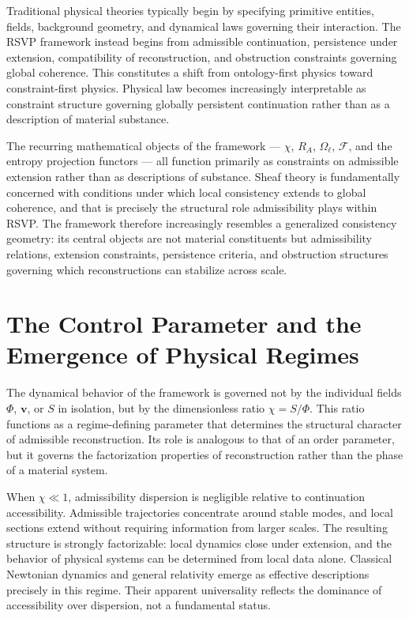 \documentclass[11pt, a4paper]{article}
\theoremstyle{plain}
\theoremstyle{definition}
\theoremstyle{remark}
\newcommand{\RA}{R_{\!A}}
\newcommand{\sheaf}{\mathcal{F}}
\begin{document}
Traditional physical theories typically begin by specifying primitive entities,
fields, background geometry, and dynamical laws governing their interaction. The RSVP
framework instead begins from admissible continuation, persistence under extension,
compatibility of reconstruction, and obstruction constraints governing global
coherence. This constitutes a shift from ontology-first physics toward
constraint-first physics. Physical law becomes increasingly interpretable as
constraint structure governing globally persistent continuation rather than as a
description of material substance.

The recurring mathematical objects of the framework --- $\chi$, $\RA$, $\Omega_\ell$,
$\sheaf$, and the entropy projection functors --- all function primarily as
constraints on admissible extension rather than as descriptions of substance. Sheaf
theory is fundamentally concerned with conditions under which local consistency
extends to global coherence, and that is precisely the structural role admissibility
plays within RSVP\@. The framework therefore increasingly resembles a generalized
consistency geometry: its central objects are not material constituents but
admissibility relations, extension constraints, persistence criteria, and obstruction
structures governing which reconstructions can stabilize across scale.

\section{The Control Parameter and the Emergence of Physical Regimes}
\label{sec:chi-interpretation}

The dynamical behavior of the framework is governed not by the individual fields
$\Phi$, $\mathbf{v}$, or $S$ in isolation, but by the dimensionless ratio $\chi =
S/\Phi$. This ratio functions as a regime-defining parameter that determines the
structural character of admissible reconstruction. Its role is analogous to that of
an order parameter, but it governs the factorization properties of reconstruction
rather than the phase of a material system.

When $\chi \ll 1$, admissibility dispersion is negligible relative to continuation
accessibility. Admissible trajectories concentrate around stable modes, and local
sections extend without requiring information from larger scales. The resulting
structure is strongly factorizable: local dynamics close under extension, and the
behavior of physical systems can be determined from local data alone. Classical
Newtonian dynamics and general relativity emerge as effective descriptions precisely
in this regime. Their apparent universality reflects the dominance of accessibility
over dispersion, not a fundamental status.
\end{document}
